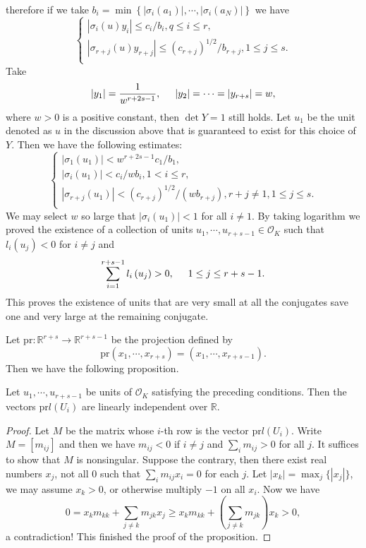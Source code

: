 therefore if we take $b_i=\min \left\{ \left| \sigma _i\left( a_1 \right) \right|,\cdots ,\left| \sigma _i\left( a_N \right) \right| \right\} $ we have 
$$
\begin{cases}
	\left| \sigma _i\left( u \right) y_i \right|\le c_i/b_i,q\le i\le r,\\
	\left| \sigma _{r+j}\left( u \right) y_{r+j} \right|\le \left( c_{r+j} \right) ^{1/2}/b_{r+j},1\le j\le s.\\
\end{cases}
$$
Take 
$$
\left| y_1 \right|=\frac{1}{w^{r+2s-1}},\hspace{0.5cm}\left| y_2 \right|=\cdots =\left| y_{r+s} \right|=w,
$$
where $w>0$ is a positive constant, then $\det Y=1$ still holds. Let $u_1$ be the unit denoted as $u$ in the discussion above that is guaranteed to exist for this choice of $Y$. Then we have the following estimates:
$$
\begin{cases}
	\left| \sigma _1\left( u_1 \right) \right|<w^{r+2s-1}c_1/b_1,\\
	\left| \sigma _i\left( u_1 \right) \right|<c_i/wb_i,1<i\le r,\\
	\left| \sigma _{r+j}\left( u_1 \right) \right|<\left( c_{r+j} \right) ^{1/2}/\left( wb_{r+j} \right) ,r+j\ne 1,1\le j\le s.\\
\end{cases}
$$
We may select $w$ so large that $|\sigma_i(u_1)|<1$ for all $i\ne 1$. By taking logarithm we proved the existence of a collection of units $u_1,\cdots,u_{r+s-1}\in\mathcal{O}_K$ such that $l_i(u_j)<0$ for $i\ne j$ and 
$$
\sum_{i=1}^{r+s-1}{l_i\left( u_j \right)}>0,\hspace{0.5cm}1\le j\le r+s-1.
$$
This proves the existence of units that are very small at all the conjugates save one and very large at the remaining conjugate.\par
Let $\mathrm{pr}:\mathbb{R}^{r+s}\to\mathbb{R}^{r+s-1}$ be the projection defined by 
$$
\mathrm{pr}\left( x_1,\cdots ,x_{r+s} \right) =\left( x_1,\cdots ,x_{r+s-1} \right) .
$$
Then we have the following proposition.
\begin{proposition}\label{lUlattice2}
Let $u_1,\cdots,u_{r+s-1}$ be units of $\mathcal{O}_K$ satisfying the preceding conditions. Then the vectors $\mathrm{pr}l(U_i)$ are linearly independent over $\mathbb{R}$.
\end{proposition}
\begin{proof}
Let $M$ be the matrix whose $i$-th row is the vector $\mathrm{pr}l(U_i)$. Write $M=[m_{ij}]$ and then we have $m_{ij}<0$ if $i\ne j$ and $\sum_im_{ij}>0$ for all $j$. It suffices to show that $M$ is nonsingular. Suppose the contrary, then there exist real numbers $x_j$, not all $0$ such that $\sum_im_{ij}x_i=0$ for each $j$. Let $|x_k|=\max_j\{|x_j|\}$, we may assume $x_k>0$, or otherwise multiply $-1$ on all $x_i$. Now we have 
$$
0=x_km_{kk}+\sum_{j\ne k}{m_{jk}x_j}\ge x_km_{kk}+\left( \sum_{j\ne k}{m_{jk}} \right) x_k>0,
$$
a contradiction! This finished the proof of the proposition.
\end{proof}
